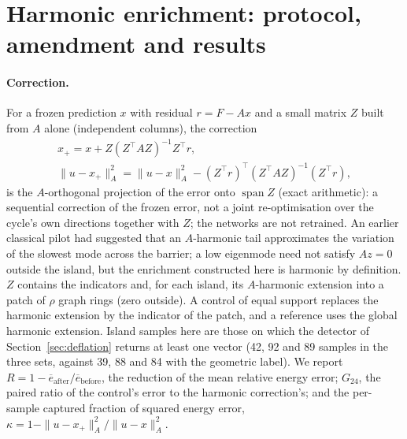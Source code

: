 \section{Harmonic enrichment: protocol, amendment and results}\label{app:harmonic}

\paragraph{Correction.} For a frozen prediction $x$ with residual $r = F - Ax$ and a small matrix $Z$ built from $A$ alone
(independent columns), the correction
\begin{gather*}
  x_+ = x + Z(Z^\top AZ)^{-1}Z^\top r,\\
  \|u-x_+\|_A^2 = \|u-x\|_A^2 - (Z^\top r)^\top(Z^\top AZ)^{-1}(Z^\top r),
\end{gather*}
is the $A$-orthogonal projection of the error onto $\operatorname{span}Z$ (exact arithmetic): a sequential correction of the
frozen error, not a joint re-optimisation over the cycle's own directions together with $Z$; the networks are not retrained. An
earlier classical pilot had suggested that an $A$-harmonic tail approximates the variation of the slowest mode across the
barrier; a low eigenmode need not satisfy $Az=0$ outside the island, but the enrichment constructed here is harmonic by
definition. $Z$ contains the indicators and, for each island, its $A$-harmonic extension into a patch of $\rho$ graph rings (zero
outside). A control of equal support replaces the harmonic extension by the indicator of the patch, and a reference uses the
global harmonic extension. Island samples here are those on which the detector of Section~\ref{sec:deflation} returns at least
one vector (42, 92 and 89 samples in the three sets, against 39, 88 and 84 with the geometric label). We report
$R = 1-\overline{e}_{\mathrm{after}}/\overline{e}_{\mathrm{before}}$, the reduction of the mean relative energy error; $G_{24}$,
the paired ratio of the control's error to the harmonic correction's; and the per-sample captured fraction of squared energy
error, $\kappa = 1 - \|u-x_+\|_A^2/\|u-x\|_A^2$.

